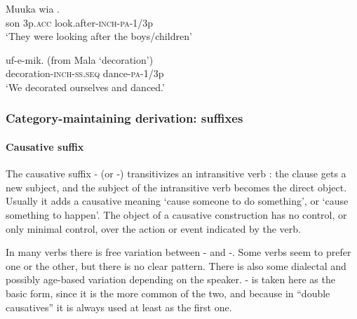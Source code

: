 \ea%
\label{ex:3:x487}
\gll Muuka wia .   \\
son 3p.\textsc{acc} look.after-\textsc{inch}-\textsc{pa}-1/3p\\
\glt`They were looking after the boys/children'
\z

\ea%
\label{ex:3:x488}
\gll {} uf-e-mik. (from Mala  `decoration') \\
decoration-\textsc{inch}-\textsc{ss}.\textsc{seq} dance-\textsc{pa}-1/3p\\
\glt`We decorated ourselves and danced.'
\z

\subsubsection{Category-maintaining derivation: suffixes}\label{sec:3:z:y:x}
{}
\paragraph{Causative suffix}\label{sec:3:a:z:y:x}
{}
The causative suffix \nobreakdash- (or \nobreakdash-) transitivizes an intransitive verb \citep[2]{Peterson2007}: the clause gets a new subject, and the subject of the intransitive verb becomes the direct object. Usually it adds a causative meaning `cause someone to do something', or `cause something to happen'. The object of a causative construction has no control, or only minimal control, over the action or event indicated by the verb.

In many verbs there is free variation between \nobreakdash- and \nobreakdash-. Some verbs seem to prefer one or the other, but there is no clear pattern. There is also some dialectal and possibly age-based variation depending on the speaker. \nobreakdash- is taken here as the basic form, since it is the more common of the two, and because in ``double causatives'' it is always used at least as the first one. 

